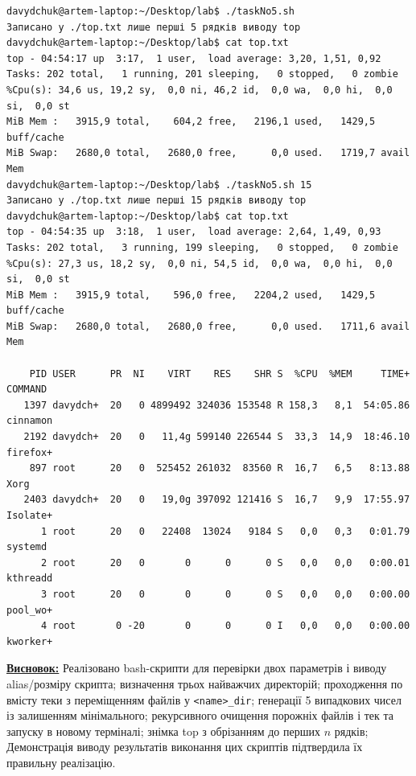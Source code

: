 \documentclass[a4paper,12pt]{article}
\begin{document}
    \begin{verbatim}
davydchuk@artem-laptop:~/Desktop/lab$ ./taskNo5.sh
Записано у ./top.txt лише перші 5 рядків виводу top
davydchuk@artem-laptop:~/Desktop/lab$ cat top.txt
top - 04:54:17 up  3:17,  1 user,  load average: 3,20, 1,51, 0,92
Tasks: 202 total,   1 running, 201 sleeping,   0 stopped,   0 zombie
%Cpu(s): 34,6 us, 19,2 sy,  0,0 ni, 46,2 id,  0,0 wa,  0,0 hi,  0,0 si,  0,0 st 
MiB Mem :   3915,9 total,    604,2 free,   2196,1 used,   1429,5 buff/cache     
MiB Swap:   2680,0 total,   2680,0 free,      0,0 used.   1719,7 avail Mem 
davydchuk@artem-laptop:~/Desktop/lab$ ./taskNo5.sh 15
Записано у ./top.txt лише перші 15 рядків виводу top
davydchuk@artem-laptop:~/Desktop/lab$ cat top.txt
top - 04:54:35 up  3:18,  1 user,  load average: 2,64, 1,49, 0,93
Tasks: 202 total,   3 running, 199 sleeping,   0 stopped,   0 zombie
%Cpu(s): 27,3 us, 18,2 sy,  0,0 ni, 54,5 id,  0,0 wa,  0,0 hi,  0,0 si,  0,0 st 
MiB Mem :   3915,9 total,    596,0 free,   2204,2 used,   1429,5 buff/cache     
MiB Swap:   2680,0 total,   2680,0 free,      0,0 used.   1711,6 avail Mem 

    PID USER      PR  NI    VIRT    RES    SHR S  %CPU  %MEM     TIME+ COMMAND
   1397 davydch+  20   0 4899492 324036 153548 R 158,3   8,1  54:05.86 cinnamon
   2192 davydch+  20   0   11,4g 599140 226544 S  33,3  14,9  18:46.10 firefox+
    897 root      20   0  525452 261032  83560 R  16,7   6,5   8:13.88 Xorg
   2403 davydch+  20   0   19,0g 397092 121416 S  16,7   9,9  17:55.97 Isolate+
      1 root      20   0   22408  13024   9184 S   0,0   0,3   0:01.79 systemd
      2 root      20   0       0      0      0 S   0,0   0,0   0:00.01 kthreadd
      3 root      20   0       0      0      0 S   0,0   0,0   0:00.00 pool_wo+
      4 root       0 -20       0      0      0 I   0,0   0,0   0:00.00 kworker+
    \end{verbatim}

    \textbf{\underline{Висновок:}} Реалізовано bash-скрипти для перевірки двох параметрів і
    виводу alias/розміру скрипта; визначення трьох найважчих директорій; проходження по вмісту теки з переміщенням файлів у
    \texttt{<name>\_dir}; генерації 5 випадкових чисел із залишенням мінімального; рекурсивного очищення порожніх файлів і
    тек та запуску в новому терміналі; знімка top з обрізанням до перших $n$ рядків;
    Демонстрація виводу результатів виконання цих скриптів підтвердила їх правильну реалізацію.

  \newpage
\end{document}
